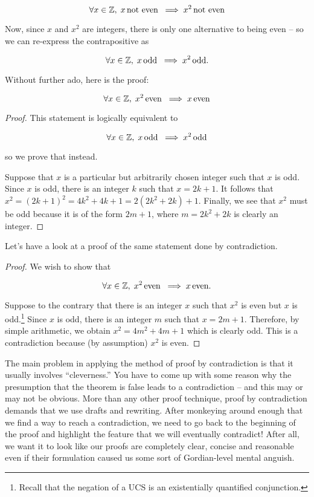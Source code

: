 \[ \forall x \in {\mathbb Z}, \; x \, \mbox{not even} \; 
\implies x^2 \, \mbox{not even} 
\]
 
Now, since $x$ and $x^2$ are integers, there is only one alternative to being
even -- so we can re-express the contrapositive as

\[ \forall x \in {\mathbb Z}, \; x \, \mbox{odd} \; \implies x^2 \, \mbox{odd}. 
\]

Without further ado, here is the proof:

\begin{thm}
\[ \forall x \in {\mathbb Z}, \; x^2 \, \mbox{even} \; 
\implies x \, \mbox{even} 
\]
\end{thm}
\begin{proof}
This statement is logically equivalent to 

\[ \forall x \in {\mathbb Z}, \; x \, \mbox{odd} \; \implies x^2 \, \mbox{odd} 
\]

\noindent so we prove that instead.

Suppose that $x$ is a particular but arbitrarily chosen integer
such that $x$ is odd.  Since $x$ is odd, there is an integer $k$ such that
$x=2k+1$.  It follows that 
$x^2 = (2k + 1)^2 = 4k^2 + 4k + 1 = 2(2k^2 + 2k) + 1$.
Finally, we see that $x^2$ must be odd because it is of the form $2m+1$, where
$m = 2k^2 + 2k$ is clearly an integer.
\end{proof}

Let's have a look at a proof of the same statement done by contradiction.

\begin{proof}
We wish to show that 

\[ \forall x \in {\mathbb Z}, \; x^2 \, \mbox{even} \; 
\implies x \, \mbox{even}. 
\]

Suppose to the contrary that there is an integer $x$ such that 
$x^2$ is even but $x$ is odd.\footnote{Recall that the negation of 
a UCS is an existentially quantified conjunction.}  Since $x$ is
odd, there is an integer $m$ such that $x=2m+1$.  Therefore, by
simple arithmetic, we obtain $x^2 = 4m^2+4m+1$ which is clearly odd.
This is a contradiction because (by assumption) $x^2$ is even. 

\end{proof}

The main problem in applying the method of proof by contradiction
is that it usually involves ``cleverness.''   You have to come up
with some reason why the presumption that the theorem is false leads
to a contradiction -- and this may or may not be obvious.  More than
any other proof technique, proof by contradiction demands that we use
drafts and rewriting.  After monkeying around enough that we find a 
way to reach a contradiction, we need to go back to the beginning
of the proof and highlight the feature that we will eventually contradict!
After all, we want it to look like our proofs are completely clear, concise
and reasonable even if their formulation caused us some sort
of Gordian-level mental anguish. 

